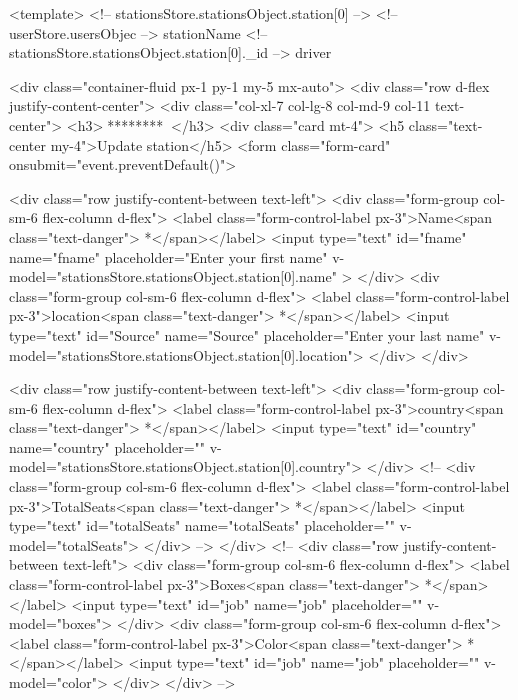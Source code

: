 <template>
    <!-- {{ stationsStore.stationsObject.station[0] }} -->
    <!-- {{ userStore.usersObjec}} -->
    {{stationName}}
    <!-- {{stationsStore.stationsObject.station[0]._id}} -->
    {{ driver }}

    <div class="container-fluid px-1 py-1 my-5 mx-auto">
        <div class="row d-flex justify-content-center">
            <div class="col-xl-7 col-lg-8 col-md-9 col-11 text-center">
                <h3>👀********🐱‍🏍</h3>
                <div class="card mt-4">
                    <h5 class="text-center my-4">Update station</h5>
                    <form class="form-card" onsubmit="event.preventDefault()">

                        <div class="row justify-content-between text-left">
                            <div class="form-group col-sm-6 flex-column d-flex"> <label
                                    class="form-control-label px-3">Name<span class="text-danger"> *</span></label> <input
                                    type="text" id="fname" name="fname" placeholder="Enter your first name"
                                   v-model="stationsStore.stationsObject.station[0].name" > </div>
                            <div class="form-group col-sm-6 flex-column d-flex"> <label
                                    class="form-control-label px-3">location<span class="text-danger"> *</span></label> <input
                                    type="text" id="Source" name="Source" placeholder="Enter your last name"
                                    v-model="stationsStore.stationsObject.station[0].location"> </div>
                        </div>

                        <div class="row justify-content-between text-left">
                            <div class="form-group col-sm-6 flex-column d-flex"> <label
                                    class="form-control-label px-3">country<span class="text-danger"> *</span></label>
                                <input type="text" id="country" name="country" placeholder="" v-model="stationsStore.stationsObject.station[0].country">
                            </div>
                            <!-- <div class="form-group col-sm-6 flex-column d-flex"> <label
                                    class="form-control-label px-3">TotalSeats<span class="text-danger"> *</span></label>
                                <input type="text" id="totalSeats" name="totalSeats" placeholder="" v-model="totalSeats">
                            </div> -->
                        </div>
                        <!-- <div class="row justify-content-between text-left">
                            <div class="form-group col-sm-6 flex-column d-flex"> <label
                                    class="form-control-label px-3">Boxes<span class="text-danger"> *</span></label> <input
                                    type="text" id="job" name="job" placeholder="" v-model="boxes"> </div>
                            <div class="form-group col-sm-6 flex-column d-flex"> <label
                                    class="form-control-label px-3">Color<span class="text-danger"> *</span></label> <input
                                    type="text" id="job" name="job" placeholder="" v-model="color"> </div>
                        </div> -->

